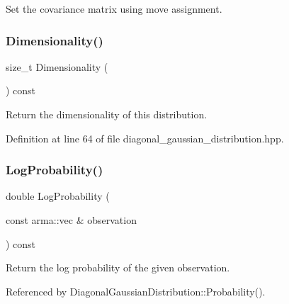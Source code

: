 Set the covariance matrix using move assignment. 

\mbox{\label{classmlpack_1_1distribution_1_1DiagonalGaussianDistribution_a78eda6bfb9e9462afa0fc85e32abe1af}} 
\subsubsection{Dimensionality()}
{\footnotesize\ttfamily size\+\_\+t Dimensionality (\begin{DoxyParamCaption}{ }\end{DoxyParamCaption}) const\hspace{0.3cm}{\ttfamily [inline]}}



Return the dimensionality of this distribution. 



Definition at line 64 of file diagonal\+\_\+gaussian\+\_\+distribution.\+hpp.

\mbox{\label{classmlpack_1_1distribution_1_1DiagonalGaussianDistribution_a7063c1fb92f512f32bf44542c7528739}} 
\subsubsection{Log\+Probability()\hspace{0.1cm}{\footnotesize\ttfamily [1/2]}}
{\footnotesize\ttfamily double Log\+Probability (\begin{DoxyParamCaption}\item[{const arma\+::vec \&}]{observation }\end{DoxyParamCaption}) const}



Return the log probability of the given observation. 



Referenced by Diagonal\+Gaussian\+Distribution\+::\+Probability().

